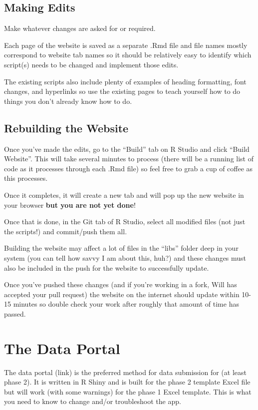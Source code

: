 \documentclass[
  letterpaper,
  DIV=11,
  numbers=noendperiod]{scrreprt}
\begin{document}
\section{Making Edits}\label{making-edits}

Make whatever changes are asked for or required.

Each page of the website is saved as a separate .Rmd file and file names
mostly correspond to website tab names so it should be relatively easy
to identify which script(s) needs to be changed and implement those
edits.

The existing scripts also include plenty of examples of heading
formatting, font changes, and hyperlinks so use the existing pages to
teach yourself how to do things you don't already know how to do.

\section{Rebuilding the Website}\label{rebuilding-the-website}

Once you've made the edits, go to the ``Build'' tab on R Studio and
click ``Build Website''. This will take several minutes to process
(there will be a running list of code as it processes through each .Rmd
file) so feel free to grab a cup of coffee as this processes.

Once it completes, it will create a new tab and will pop up the new
website in your browser \textbf{but you are not yet done}!

Once that is done, in the Git tab of R Studio, select all modified files
(not just the scripts!) and commit/push them all.

Building the website may affect a lot of files in the ``libs'' folder
deep in your system (you can tell how savvy I am about this, huh?) and
these changes must also be included in the push for the website to
successfully update.

Once you've pushed these changes (and if you're working in a fork, Will
has accepted your pull request) the website on the internet should
update within 10-15 minutes so double check your work after roughly that
amount of time has passed.

\chapter{The Data Portal}\label{the-data-portal}

The data portal (link) is the preferred method for data submission for
(at least phase 2). It is written in R Shiny and is built for the phase
2 template Excel file but will work (with some warnings) for the phase 1
Excel template. This is what you need to know to change and/or
troubleshoot the app.
\end{document}
